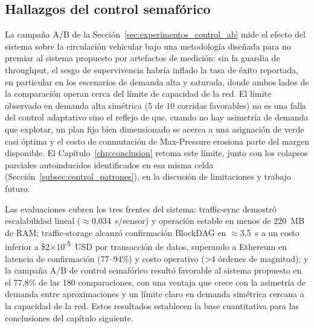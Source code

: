\subsection{Hallazgos del control semafórico}
\label{subsec:discusion_control}

La campaña A/B de la Sección~\ref{sec:experimentos_control_ab} mide el efecto del sistema
sobre la circulación vehicular bajo una metodología diseñada para no premiar al sistema
propuesto por artefactos de medición: sin la guardia de throughput, el sesgo de
supervivencia habría inflado la tasa de éxito reportada, en particular en los escenarios
de demanda alta y saturada, donde ambos lados de la comparación operan cerca del límite
de capacidad de la red. El límite observado en demanda alta simétrica (5 de 10 corridas
favorables) no es una falla del control adaptativo sino el reflejo de que, cuando no hay
asimetría de demanda que explotar, un plan fijo bien dimensionado se acerca a una
asignación de verde casi óptima y el costo de conmutación de Max-Pressure erosiona parte
del margen disponible. El Capítulo~\ref{chp:conclusion} retoma este límite, junto con los
colapsos parciales autoinducidos identificados en esa misma celda
(Sección~\ref{subsec:control_patrones}), en la discusión de limitaciones y trabajo
futuro.

Las evaluaciones cubren los tres frentes del sistema: traffic-sync demostró
escalabilidad lineal ($\approx$0{,}034~s/sensor) y operación estable en menos de
220~MB de RAM; traffic-storage alcanzó confirmación BlockDAG en $\approx$3,5~s a un
costo inferior a \$2$\times$10\textsuperscript{-5}~USD por transacción de datos, superando
a Ethereum en latencia de confirmación (77--94\%) y costo operativo (>4 órdenes de magnitud);
y la campaña A/B de control semafórico resultó favorable al sistema propuesto en el
77,8\% de las 180 comparaciones, con una ventaja que crece con la asimetría de demanda
entre aproximaciones y un límite claro en demanda simétrica cercana a la capacidad de
la red. Estos resultados establecen la base cuantitativa para las conclusiones del
capítulo siguiente.
